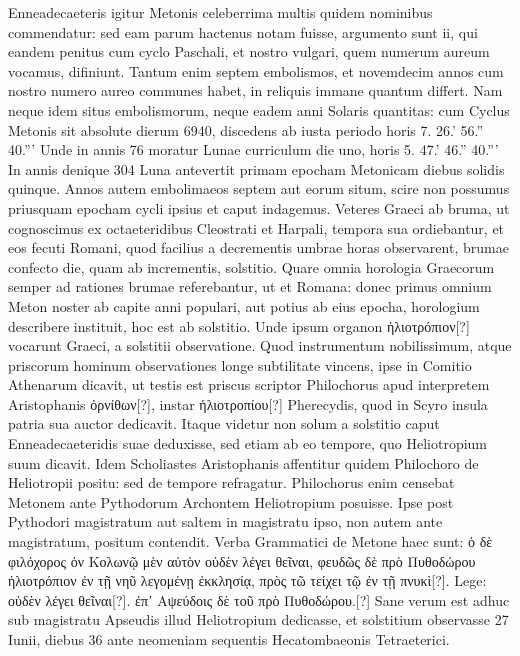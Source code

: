 Enneadecaeteris
igitur Metonis celeberrima multis quidem nominibus commendatur:
sed eam parum hactenus notam fuisse, argumento sunt ii,
qui eandem penitus cum cyclo Paschali, et nostro vulgari, quem
numerum aureum vocamus, difiniunt.
Tantum enim septem embolismos,
et novemdecim annos cum nostro numero aureo communes
habet, in reliquis immane quantum differt.
Nam neque
idem situs embolismorum, neque eadem anni Solaris quantitas:
cum Cyclus Metonis sit absolute dierum 6940, discedens
ab iusta periodo horis 7. 26.' 56.'' 40.'''
Unde in annis 76 moratur
Lunae curriculum die uno, horis 5. 47.' 46.'' 40.'''
In annis
denique 304 Luna antevertit primam epocham Metonicam diebus
solidis quinque.
Annos autem embolimaeos septem aut eorum
situm, scire non possumus priusquam epocham cycli ipsius
et caput indagemus.
Veteres Graeci ab bruma, ut cognoscimus
ex octaeteridibus Cleostrati et Harpali, tempora sua ordiebantur,
et eos fecuti Romani, quod facilius a decrementis umbrae
horas observarent, brumae confecto die, quam ab incrementis,
solstitio.
Quare omnia horologia Graecorum semper
ad rationes brumae referebantur, ut et Romana: donec primus
omnium Meton noster ab capite anni populari, aut potius ab eius
epocha, horologium describere instituit, hoc est ab solstitio.
Unde
ipsum organon \textgreek{ἡλιοτρόπιον[?]} vocarunt Graeci,
 a solstitii observatione.
Quod instrumentum nobilissimum, atque priscorum hominum
observationes longe subtilitate vincens, ipse in Comitio
Athenarum dicavit, ut testis est priscus scriptor Philochorus apud
interpretem Aristophanis \textgreek{ὀρνίθων[?]},
 instar \textgreek{ἡλιοτροπίου[?]} Pherecydis, quod
in Scyro insula patria sua auctor dedicavit.
Itaque videtur non solum
a solstitio caput Enneadecaeteridis suae deduxisse, sed etiam
ab eo tempore, quo Heliotropium suum dicavit.
Idem
Scholiastes Aristophanis affentitur quidem Philochoro de Heliotropii
positu: sed de tempore refragatur.
Philochorus enim
censebat Metonem ante Pythodorum Archontem Heliotropium
posuisse.
Ipse post Pythodori magistratum aut saltem in magistratu
ipso, non autem ante magistratum, positum contendit.
Verba
Grammatici de Metone haec sunt: \textgreek{ὁ δὲ φιλόχορος ὀν Κολωνῷ μὲν
αὐτὸν οὐδὲν λέγει θεῖναι, φευδῶς δὲ πρὸ Πυθοδώρου ἡλιοτρόπιον ἐν τῇ νηῦ
λεγομένῃ ἐκκλησίᾳ, πρὸς τῶ τείχει τῷ ἐν τῇ πνυκὶ[?]}.
Lege: \textgreek{οὐδὲν λέγει
θεῖναι[?]}.
\textgreek{ἐπ᾽ Αψεύδοις δὲ τοῦ πρὸ Πυθοδώρου.[?]}
Sane verum est adhuc
sub magistratu Apseudis illud Heliotropium dedicasse, et solstitium
observasse 27 Iunii, diebus 36 ante neomeniam sequentis Hecatombaeonis
Tetraeterici.

